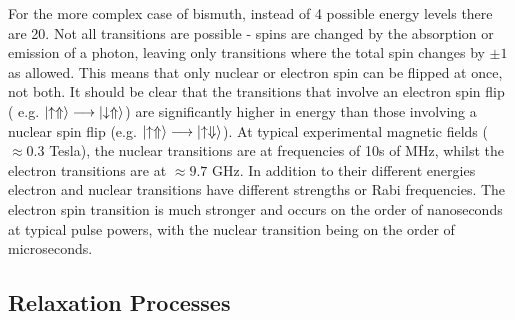 For the more complex case of bismuth, instead of 4 possible energy levels there are 20. 
Not all transitions are possible - spins are changed by the absorption or emission of a photon, leaving only transitions where the total spin changes by $\pm1$ as allowed.
This means that only nuclear or electron spin can be flipped at once, not both. 
It should be clear that the transitions that involve an electron spin flip ( e.g. $\ket{\uparrow \Uparrow} \longrightarrow \ket{\downarrow \Uparrow}$) are significantly higher in energy than those involving a nuclear spin flip (e.g. $\ket{\uparrow \Uparrow} \longrightarrow \ket{\uparrow \Downarrow}$). 
At typical experimental magnetic fields ($\approx 0.3$ Tesla), the nuclear transitions are at frequencies of 10s of MHz, whilst the electron transitions are at $\approx 9.7$ GHz.
In addition to their different energies electron and nuclear transitions have different strengths or Rabi frequencies. 
The electron spin transition is much stronger and occurs on the order of nanoseconds at typical pulse powers, with the nuclear transition being on the order of microseconds.

\subsection{Relaxation Processes}

